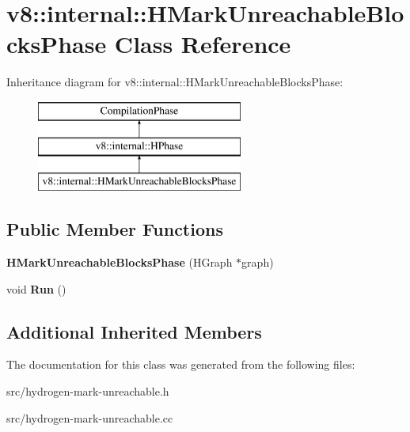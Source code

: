\hypertarget{classv8_1_1internal_1_1_h_mark_unreachable_blocks_phase}{}\section{v8\+:\+:internal\+:\+:H\+Mark\+Unreachable\+Blocks\+Phase Class Reference}
\label{classv8_1_1internal_1_1_h_mark_unreachable_blocks_phase}
Inheritance diagram for v8\+:\+:internal\+:\+:H\+Mark\+Unreachable\+Blocks\+Phase\+:\begin{figure}[H]
\begin{center}
\leavevmode
\includegraphics[height=3.000000cm]{classv8_1_1internal_1_1_h_mark_unreachable_blocks_phase}
\end{center}
\end{figure}
\subsection*{Public Member Functions}
\begin{DoxyCompactItemize}
\item 
\hypertarget{classv8_1_1internal_1_1_h_mark_unreachable_blocks_phase_a30a9df49e5dba6a7e215dd7a70204ee5}{}{\bfseries H\+Mark\+Unreachable\+Blocks\+Phase} (H\+Graph $\ast$graph)\label{classv8_1_1internal_1_1_h_mark_unreachable_blocks_phase_a30a9df49e5dba6a7e215dd7a70204ee5}

\item 
\hypertarget{classv8_1_1internal_1_1_h_mark_unreachable_blocks_phase_a4a32ce0344eda26d366967cf30c1ed58}{}void {\bfseries Run} ()\label{classv8_1_1internal_1_1_h_mark_unreachable_blocks_phase_a4a32ce0344eda26d366967cf30c1ed58}

\end{DoxyCompactItemize}
\subsection*{Additional Inherited Members}


The documentation for this class was generated from the following files\+:\begin{DoxyCompactItemize}
\item 
src/hydrogen-\/mark-\/unreachable.\+h\item 
src/hydrogen-\/mark-\/unreachable.\+cc\end{DoxyCompactItemize}
